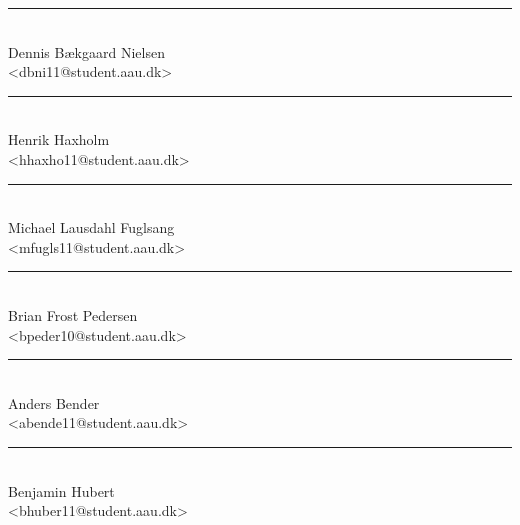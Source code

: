 \begin{minipage}[b]{0.45\textwidth}
 \centering
 \vspace{12pt}
 \rule{\textwidth}{0.5pt}\\
  Dennis Bækgaard Nielsen\\
 {\footnotesize <dbni11@student.aau.dk>}\\
 \vspace{12pt}
 \centering
 \vspace{12pt}
 \rule{\textwidth}{0.5pt}\\
  Henrik Haxholm\\
 {\footnotesize <hhaxho11@student.aau.dk>}\\
 \vspace{12pt}
 \centering
 \vspace{12pt}
 \rule{\textwidth}{0.5pt}\\
  Michael Lausdahl Fuglsang\\
 {\footnotesize <mfugls11@student.aau.dk>}\\
 \vspace{12pt}
\end{minipage}
\hfill
\begin{minipage}[b]{0.45\textwidth}
\centering
 \vspace{12pt}
 \rule{\textwidth}{0.5pt}\\
  Brian Frost Pedersen\\
 {\footnotesize <bpeder10@student.aau.dk>}\\
 \vspace{12pt}
 \centering
 \vspace{12pt}
 \rule{\textwidth}{0.5pt}\\
  Anders Bender\\
 {\footnotesize <abende11@student.aau.dk>}\\
 \vspace{12pt}
 \centering
 \vspace{12pt}
 \rule{\textwidth}{0.5pt}\\
  Benjamin Hubert\\
 {\footnotesize <bhuber11@student.aau.dk>}\\
 \vspace{12pt}
\end{minipage}%
